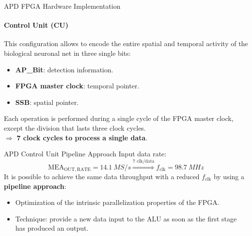 \documentclass{beamer}
\begin{document}
\begin{frame}{APD FPGA Hardware Implementation}
    \framesubtitle{Control Unit (CU)}
    This configuration allows to encode the entire spatial and temporal activity of the biological neuronal net in three single bits:
    \begin{itemize}
        \item \alert{\bf AP\_Bit}: detection information.
        \item \alert{\bf FPGA master clock}: temporal pointer.
        \item \alert{\bf SSB}: spatial pointer.
    \end{itemize}
    Each operation is performed during a single cycle of the FPGA master clock, except the division that lasts three clock cycles.\\
    $\Longrightarrow$ {\bf 7 clock cycles to process a single data}.
\end{frame}

\begin{frame}{APD Control Unit Pipeline Approach}
    Input data rate:
    \[
        \text{MEA}_{\mathrm{OUT,RATE}} = 14.1 \ \si{MS/s}
        \overset{\text{7 clk/data}}{\Longrightarrow}
        f_{\mathrm{clk}} = 98.7 \ \si{MHz}
    \]
    It is possible to achieve the same data throughput with a reduced $f_{\mathrm{clk}}$ by using a \alert{\bf pipeline approach}:
    \begin{itemize}
        \item Optimization of the intrinsic parallelization properties of the FPGA.
        \item Technique: provide a new data input to the ALU as soon as the first stage has produced an output.
    \end{itemize}
\end{frame}
\end{document}
